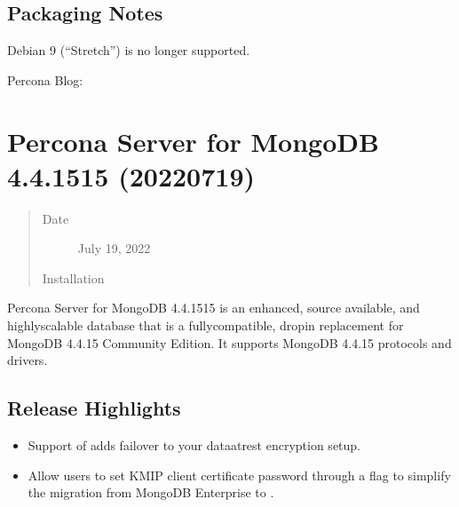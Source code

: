 \documentclass[letterpaper,10pt,english]{sphinxmanual}
\begin{document}
\subsection{Packaging Notes}
\label{\detokenize{release_notes/4.4.16-16:packaging-notes}}
\sphinxAtStartPar
Debian 9 (“Stretch”) is no longer supported.


\nopagebreak


\sphinxAtStartPar
Percona Blog: 




\section{Percona Server for MongoDB 4.4.15\sphinxhyphen{}15 (2022\sphinxhyphen{}07\sphinxhyphen{}19)}
\label{\detokenize{release_notes/4.4.15-15:percona-server-for-mongodb-4-4-15-15-2022-07-19}}\label{\detokenize{release_notes/4.4.15-15:psmdb-4-4-15-15}}\label{\detokenize{release_notes/4.4.15-15::doc}}\begin{quote}\begin{description}
\item[{Date}] \leavevmode
\sphinxAtStartPar
July 19, 2022

\item[{Installation}] \leavevmode
\sphinxAtStartPar
{\hyperref[\detokenize{install/index:install}]{}}

\end{description}\end{quote}

\sphinxAtStartPar
Percona Server for MongoDB 4.4.15\sphinxhyphen{}15 is an enhanced, source available, and highly\sphinxhyphen{}scalable database that is a
fully\sphinxhyphen{}compatible, drop\sphinxhyphen{}in replacement for MongoDB 4.4.15 Community Edition.
It supports MongoDB 4.4.15 protocols and drivers.


\subsection{Release Highlights}
\label{\detokenize{release_notes/4.4.15-15:release-highlights}}\begin{itemize}
\item {} 
\sphinxAtStartPar
Support of {\hyperref[\detokenize{kmip:kmip}]{}} adds failover to your data\sphinxhyphen{}at\sphinxhyphen{}rest encryption setup.

\item {} 
\sphinxAtStartPar
Allow users to set KMIP client certificate password through a flag to simplify the migration from MongoDB Enterprise to .

\end{itemize}
\end{document}
